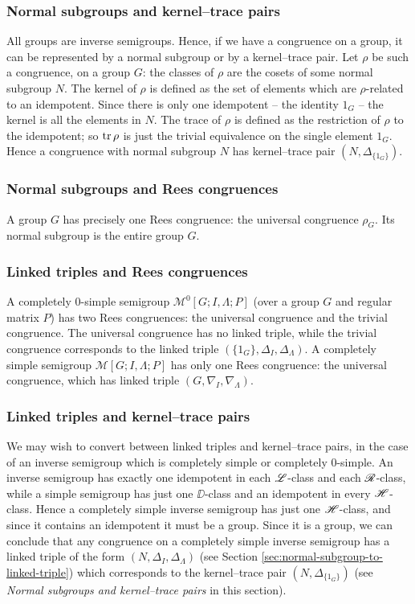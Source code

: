 \subsubsection{Normal subgroups and kernel--trace pairs}
All groups are inverse semigroups.  Hence, if we have a congruence on a group,
it can be represented by a normal subgroup or by a kernel--trace pair.  Let
$\rho$ be such a congruence, on a group $G$: the classes of $\rho$ are the
cosets of some normal subgroup $N$.  The kernel of $\rho$ is defined as the set
of elements which are $\rho$-related to an idempotent.  Since there is only one
idempotent -- the identity $1_G$ -- the kernel is all the elements in $N$.  The
trace of $\rho$ is defined as the restriction of $\rho$ to the idempotent; so
$\operatorname{tr}\rho$ is just the trivial equivalence on the single element $1_G$.  Hence a
congruence with normal subgroup $N$ has kernel--trace pair
$(N, \Delta_{\{1_G\}})$.

\subsubsection{Normal subgroups and Rees congruences}
A group $G$ has precisely one Rees congruence: the universal congruence
$\rho_G$.  Its normal subgroup is the entire group $G$.

\subsubsection{Linked triples and Rees congruences}
A completely 0-simple semigroup $\mathcal{M}^0[G;I,\Lambda;P]$ (over a group $G$
and regular matrix $P$) has two Rees
congruences: the universal congruence and the trivial congruence.  The universal
congruence has no linked triple, while the trivial congruence corresponds to the
linked triple $(\{1_G\}, \Delta_I, \Delta_\Lambda)$.  A completely simple
semigroup $\mathcal{M}[G;I,\Lambda;P]$ has only one Rees congruence: the
universal congruence, which has linked triple $(G, \nabla_I, \nabla_\Lambda)$.

\subsubsection{Linked triples and kernel--trace pairs}
We may wish to convert between linked triples and kernel--trace pairs, in the
case of an inverse semigroup which is completely simple or completely 0-simple.
An inverse semigroup has exactly one idempotent in each $\mathrel{\mathscr{L}}$-class and each
$\mathrel{\mathscr{R}}$-class, while a simple semigroup has just one $\DD$-class and an idempotent
in every $\mathrel{\mathscr{H}}$-class.  Hence a completely simple inverse semigroup has just one
$\mathrel{\mathscr{H}}$-class, and since it contains an idempotent it must be a group.  Since it
is a group, we can conclude that any congruence on a completely simple inverse
semigroup has a linked triple of the form $(N, \Delta_I, \Delta_\Lambda)$ (see
Section \ref{sec:normal-subgroup-to-linked-triple}) which corresponds to the
kernel--trace pair $(N, \Delta_{\{1_G\}})$ (see \textit{Normal subgroups and
  kernel--trace pairs} in this section).

